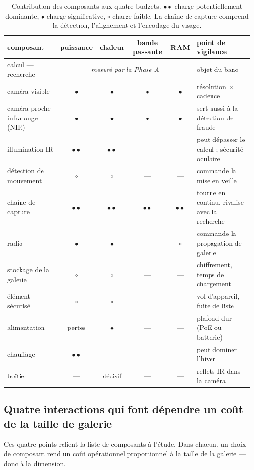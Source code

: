 \documentclass[11pt,a4paper]{article}
\newcommand{\fort}{$\bullet\bullet$}
\newcommand{\moy}{$\bullet$}
\newcommand{\faible}{$\circ$}
\begin{document}
\begin{table}[h]
\centering\small
\begin{tabularx}{\textwidth}{@{}>{\raggedright\arraybackslash}Xcccc>{\raggedright\arraybackslash}p{4.2cm}@{}}
\toprule
composant & puissance & chaleur & bande passante & RAM & point de vigilance \\
\midrule
calcul — recherche & \multicolumn{4}{c}{\emph{mesuré par la Phase A}} & objet du banc \\
caméra visible & \moy{} & \moy{} & \moy{} & \moy{} & résolution × cadence \\
caméra proche infrarouge (NIR) & \moy{} & \moy{} & \moy{} & \moy{} & sert aussi à la détection de fraude \\
illumination IR & \fort{} & \fort{} & — & — & peut dépasser le calcul ; sécurité oculaire \\
détection de mouvement & \faible{} & \faible{} & — & — & commande la mise en veille \\
chaîne de capture & \fort{} & \fort{} & \fort{} & \fort{} & tourne en continu, rivalise avec la recherche \\
radio & \moy{} & \moy{} & — & \faible{} & commande la propagation de galerie \\
stockage de la galerie & \faible{} & \faible{} & — & — & chiffrement, temps de chargement \\
élément sécurisé & \faible{} & \faible{} & — & — & vol d'appareil, fuite de liste \\
alimentation & pertes & \moy{} & — & — & plafond dur (PoE ou batterie) \\
chauffage & \fort{} & — & — & — & peut dominer l'hiver \\
boîtier & — & décisif & — & — & reflets IR dans la caméra \\
\bottomrule
\end{tabularx}
\caption{Contribution des composants aux quatre budgets. \fort{} charge potentiellement
dominante, \moy{} charge significative, \faible{} charge faible. La chaîne de capture comprend la
détection, l'alignement et l'encodage du visage.}
\label{tab:composants}
\end{table}

\subsection{Quatre interactions qui font dépendre un coût de la taille de galerie}

Ces quatre points relient la liste de composants à l'étude. Dans chacun, un choix de
composant rend un coût opérationnel proportionnel à la taille de la galerie — donc à
la dimension.
\end{document}
